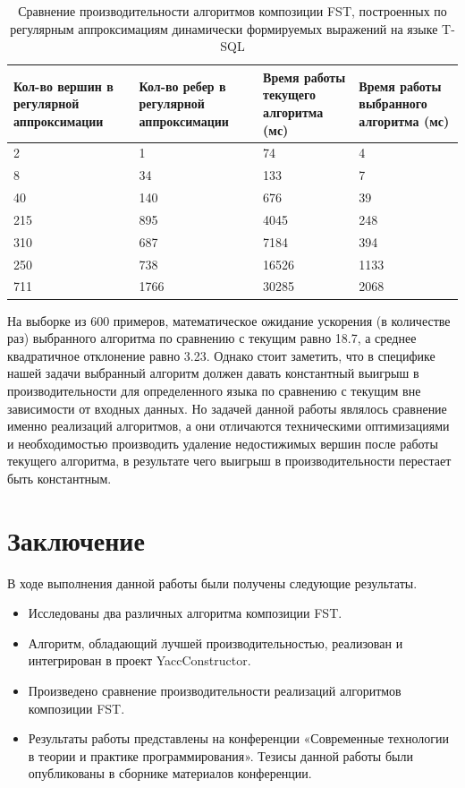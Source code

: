\documentclass[14pt]{matmex-diploma}
\begin{document}
\begin{table}[h]
  \centering
    \begin{tabular}{ | p{3.8cm} | p{3.6cm} | p{3.7cm} | p{3.7cm} | }
  \hline
  Кол-во вершин в регулярной аппроксимации &
  Кол-во ребер в регулярной аппроксимации & 
  Время работы текущего алгоритма (мс) & 
  Время работы выбранного алгоритма (мс) \\ \hline
  2 & 1 & 74 & 4 \\ \hline
  8 & 34 & 133 & 7 \\ \hline
  40 & 140 & 676 & 39 \\ \hline
  215 & 895 & 4045 & 248 \\ \hline
  310 & 687 & 7184 & 394 \\ \hline
  250 & 738 & 16526 & 1133 \\ \hline
  711 & 1766 & 30285 & 2068 \\ \hline
  \end{tabular}
  \caption{Сравнение производительности алгоритмов композиции FST, построенных по регулярным аппроксимациям динамически формируемых выражений на языке T-SQL}
  \label{таблица_измерений}
\end{table}

На выборке из 600 примеров, математическое ожидание ускорения (в количестве раз) выбранного алгоритма по сравнению с текущим равно 18.7, а среднее квадратичное отклонение равно 3.23. Однако стоит заметить, что в специфике нашей задачи выбранный алгоритм должен давать константный выигрыш в производительности для определенного языка по сравнению с текущим вне зависимости от входных данных. Но задачей данной работы являлось сравнение именно реализаций алгоритмов, а они отличаются техническими оптимизациями и необходимостью производить удаление недостижимых вершин после работы текущего алгоритма, в результате чего выигрыш в производительности перестает быть константным.

\section*{Заключение}
В ходе выполнения данной работы были получены следующие результаты.

\begin{itemize}
  \item Исследованы два различных алгоритма композиции FST.
  \item Алгоритм, обладающий лучшей производительностью, реализован и интегрирован в проект YaccConstructor.
  \item Произведено сравнение производительности реализаций алгоритмов композиции FST.
  \item Результаты работы представлены на конференции «Современные технологии в теории и практике программирования». Тезисы данной работы были опубликованы в сборнике материалов конференции.
\end{itemize} 
\end{document}
